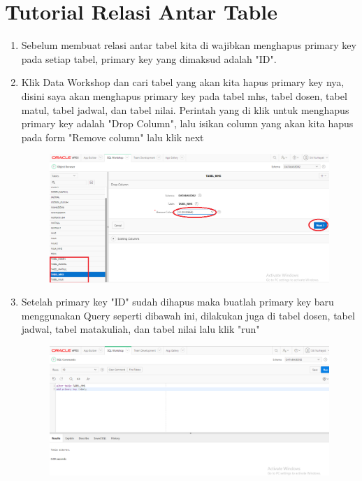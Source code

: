 \section*{Tutorial Relasi Antar Table}
\begin{enumerate}
	
	\item Sebelum membuat relasi antar tabel kita di wajibkan menghapus primary key pada setiap tabel, primary key yang dimaksud adalah "ID".  
	
	\item Klik Data Workshop dan cari tabel yang akan kita hapus primary key nya, disini saya akan menghapus primary key pada tabel mhs, tabel dosen, tabel matul, tabel jadwal, dan tabel nilai. Perintah yang di klik untuk menghapus primary key adalah "Drop Column", lalu isikan column yang akan kita hapus pada form "Remove column" lalu klik next    
	\begin{figure} [!htbp]
	\includegraphics[scale=0.2]{Apex/18a.png}
	\centering
	\end{figure}
	
	\item Setelah primary key "ID" sudah dihapus maka buatlah primary key baru menggunakan Query seperti dibawah ini, dilakukan juga di tabel dosen, tabel jadwal, tabel matakuliah, dan tabel nilai lalu klik "run"
	\begin{figure} [!htbp]
	\includegraphics[scale=0.2]{Apex/19.png}
	\centering
	\end{figure}
	

\end{enumerate}
